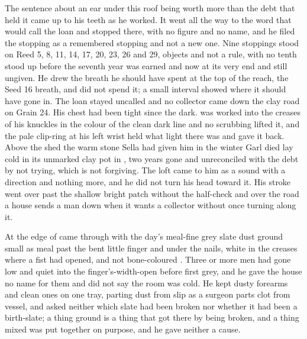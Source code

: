 The sentence about an ear under this roof being worth more than the debt that held it came up to his teeth as he worked. It went all the way to the word that would call the loan and stopped there, with no figure and no name, and he filed the stopping as a remembered stopping and not a new one. Nine stoppings stood on Reed 5, 8, 11, 14, 17, 20, 23, 26 and 29, objects and not a rule, with no tenth stood up before the seventh year was earned and now at its very end and still ungiven. He drew the breath he should have spent at the top of the reach, the Seed 16 breath, and did not spend it; a small interval showed where it should have gone in. The loan stayed uncalled and no collector came down the clay road on Grain 24. His chest had been tight since the dark.  was worked into the creases of his knuckles in the colour of the clean dark line and no scrubbing lifted it, and the pale clip-ring at his left wrist held what light there was and gave it back. Above the shed the warm stone Sella had given him in the winter Garl died lay cold in its unmarked clay pot in , two years gone and unreconciled with the debt by not trying, which is not forgiving. The loft came to him as a sound with a direction and nothing more, and he did not turn his head toward it. His stroke went over  past the shallow bright patch without the half-check and over the road a house sends a man down when it wants a collector without once turning along it.

At the edge of   came through with the day's meal-fine grey slate dust ground small as meal past the bent little finger and under the nails, white in the creases where a fist had opened, and not bone-coloured . Three or more men had gone low and quiet into the finger's-width-open  before first grey, and he gave the house no name for them and did not say the room was cold. He kept dusty forearms and clean ones on one tray, parting dust from slip as a surgeon parts clot from vessel, and asked neither which slate had been broken nor whether it had been a birth-slate; a thing ground is a thing that got there by being broken, and a thing mixed was put together on purpose, and he gave neither a cause.

